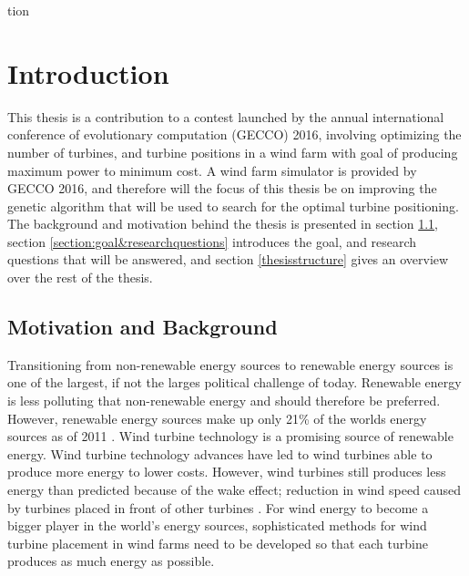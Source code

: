 tion\chapter{Introduction}\label{chapter:introduction}
This thesis is a contribution to a contest launched by the annual international conference of evolutionary computation (GECCO) 2016, involving optimizing the number of turbines, and turbine positions in a wind farm with goal of producing maximum power to minimum cost. A wind farm simulator is provided by GECCO 2016, and therefore will the focus of this thesis be on improving the genetic algorithm that will be used to search for the optimal turbine positioning. The background and motivation behind the thesis is presented in section \ref{section:motivation&background}, section \ref{section:goal&researchquestions} introduces the goal, and research questions that will be answered, and section \ref{thesisstructure} gives an overview over the rest of the thesis. 


\section{Motivation and Background}\label{section:motivation&background}
Transitioning from non-renewable energy sources to renewable energy sources is one of the largest, if not the larges political challenge of today. Renewable energy is less polluting that non-renewable energy and should therefore be preferred. However, renewable energy sources make up only 21\% of the worlds energy sources as of 2011 \citep{url1}. Wind turbine technology is a promising source of renewable energy. Wind turbine technology advances have led to wind turbines able to produce more energy to lower costs. However, wind turbines still produces less energy than predicted because of the wake effect; reduction in wind speed caused by turbines placed in front of other turbines \citep{Samorani}. For wind energy to become a bigger player in the world's energy sources, sophisticated methods for wind turbine placement in wind farms need to be developed so that each turbine produces as much energy as possible. \\

